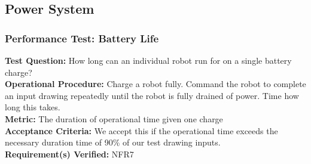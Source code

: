
\subsection{Power System}
\label{sec:verification_power}

\subsubsection{Performance Test: Battery Life}
\label{test:power_pt_battery}
\textbf{Test Question:} How long can an individual robot run for on a single battery charge? \\
\textbf{Operational Procedure:} Charge a robot fully. Command the robot to complete an input drawing repeatedly until the robot is fully drained of power. Time how long this takes. \\
\textbf{Metric:} The duration of operational time given one charge \\
\textbf{Acceptance Criteria:} We accept this if the operational time exceeds the necessary duration time of 90\% of our test drawing inputs. \\
\textbf{Requirement(s) Verified:} NFR7